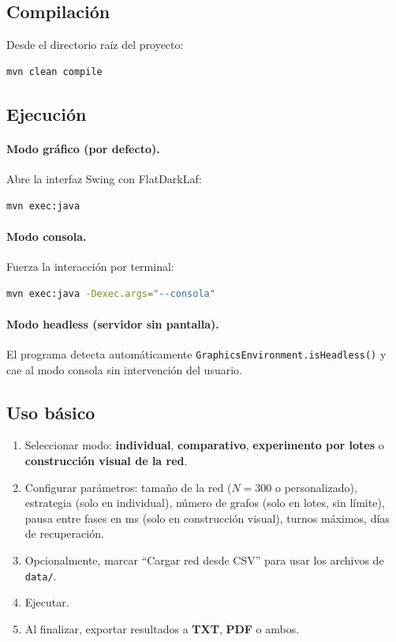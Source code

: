 \documentclass[spanish,notitlepage,letterpaper, 12pt]{article}
\begin{document}
\subsection{Compilaci\'on}

Desde el directorio ra\'iz del proyecto:

\begin{lstlisting}[language=bash, basicstyle=\small\ttfamily]
mvn clean compile
\end{lstlisting}

\subsection{Ejecuci\'on}

\paragraph{Modo gr\'afico (por defecto).} Abre la interfaz Swing con FlatDarkLaf:

\begin{lstlisting}[language=bash, basicstyle=\small\ttfamily]
mvn exec:java
\end{lstlisting}

\paragraph{Modo consola.} Fuerza la interacci\'on por terminal:

\begin{lstlisting}[language=bash, basicstyle=\small\ttfamily]
mvn exec:java -Dexec.args="--consola"
\end{lstlisting}

\paragraph{Modo headless (servidor sin pantalla).} El programa detecta autom\'aticamente \texttt{GraphicsEnvironment.isHeadless()} y cae al modo consola sin intervenci\'on del usuario.

\subsection{Uso b\'asico}

\begin{enumerate}
    \item Seleccionar modo: \textbf{individual}, \textbf{comparativo}, \textbf{experimento por lotes} o \textbf{construcci\'on visual de la red}.
    \item Configurar par\'ametros: tama\~no de la red ($N = 300$ o personalizado), estrategia (solo en individual), n\'umero de grafos (solo en lotes, sin l\'imite), pausa entre fases en ms (solo en construcci\'on visual), turnos m\'aximos, d\'ias de recuperaci\'on.
    \item Opcionalmente, marcar ``Cargar red desde CSV'' para usar los archivos de \texttt{data/}.
    \item Ejecutar.
    \item Al finalizar, exportar resultados a \textbf{TXT}, \textbf{PDF} o ambos.
\end{enumerate}
\end{document}
